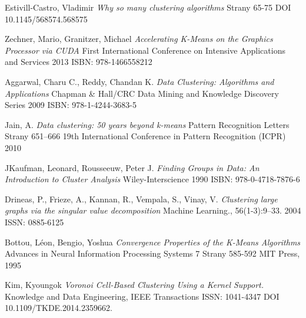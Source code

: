 
\def\bibname{Bibliography}
\begin{thebibliography}{99}
\addcontentsline{toc}{chapter}{\bibname}


{\sc Estivill-Castro,} Vladimir
\emph{Why so many clustering algorithms}
Strany 65-75
DOI 10.1145/568574.568575

{\sc Zechner,} Mario, {\sc Granitzer, } Michael
\emph{Accelerating K-Means on the Graphics Processor via CUDA}
First International Conference on Intensive Applications and Services
2013
ISBN: 978-1466558212 

{\sc Aggarwal,} Charu C., {\sc Reddy, } Chandan K.
\emph{Data Clustering: Algorithms and Applications}
Chapman \& Hall/CRC Data Mining and Knowledge Discovery Series
2009
ISBN: 978-1-4244-3683-5

{\sc Jain,} A.
\emph{Data clustering: 50 years beyond k-means}
Pattern Recognition Letters
Strany 651–666
19th International Conference in Pattern Recognition (ICPR)
2010

{\sc JKaufman,} Leonard, {\sc Rousseeuw,} Peter J.
\emph{Finding Groups in Data: An Introduction to Cluster Analysis}
Wiley-Interscience
1990
ISBN: 978-0-4718-7876-6

{\sc Drineas,} P., {\sc Frieze,} A., {\sc Kannan,} R., {\sc Vempala,}  S., {\sc Vinay,}  V.
\emph{Clustering large graphs via the singular value decomposition}
Machine Learning., 56(1-3):9–33.
2004
ISSN: 0885-6125

{\sc Bottou,} L\'{e}on, {\sc Bengio,} Yoshua
\emph{Convergence Properties of the K-Means Algorithms}
Advances in Neural Information Processing Systems 7
Strany 585-592
MIT Press, 1995

{\sc Kim,} Kyoungok
\emph{Voronoi Cell-Based Clustering Using a Kernel Support.}
Knowledge and Data Engineering, IEEE Transactions
ISSN: 1041-4347
DOI 10.1109/TKDE.2014.2359662. 


\end{thebibliography}
